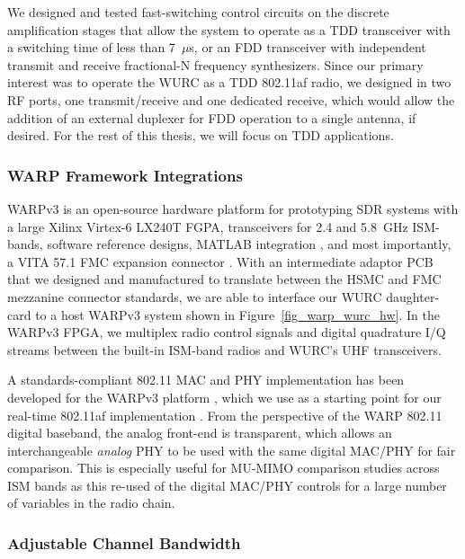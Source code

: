 	We designed and tested fast-switching control circuits on the discrete amplification stages that allow the system to operate as a \ac{TDD} transceiver with a switching time of less than 7~$\mu$s, or an \ac{FDD} transceiver with independent transmit and receive fractional-N frequency synthesizers.
	Since our primary interest was to operate the \ac{WURC} as a \ac{TDD} 802.11af radio, we designed in two RF ports, one transmit/receive and one dedicated receive, which would allow the addition of an external duplexer for \ac{FDD} operation to a single antenna, if desired.
	For the rest of this thesis, we will focus on \ac{TDD} applications.
	
\subsubsection{WARP Framework Integrations}
\label{sec_warp_mods}

	WARPv3 is an open-source hardware platform for prototyping \ac{SDR} systems with a large Xilinx Virtex-6 LX240T FGPA, transceivers for 2.4 and 5.8~GHz ISM-bands, software reference designs, MATLAB integration \cite{warpProject}, and most importantly, a VITA 57.1 FMC expansion connector \cite{samtec2018vita}.
	With an intermediate adaptor \ac{PCB} that we designed and manufactured to translate between the HSMC and FMC mezzanine connector standards, we are able to interface our \ac{WURC} daughter-card to a host WARPv3 system shown in Figure~\ref{fig_warp_wurc_hw}.
	In the WARPv3 \ac{FPGA}, we multiplex radio control signals and digital quadrature I/Q streams between the built-in ISM-band radios and WURC's UHF transceivers.

	A standards-compliant 802.11 \acf{MAC} and \acf{PHY} implementation has been developed for the WARPv3 platform \cite{warp80211}, which we use as a starting point for our real-time 802.11af implementation \cite{flores2013ieee80211af}.
	From the perspective of the WARP 802.11 digital baseband, the analog front-end is transparent, which allows an interchangeable \emph{analog} \ac{PHY} to be used with the same digital MAC/PHY for fair comparison.
	This is especially useful for MU-MIMO comparison studies across ISM bands as this re-used of the digital MAC/PHY controls for a large number of variables in the radio chain.

\subsubsection{Adjustable Channel Bandwidth}
\label{sec_warp_chan_bw}

